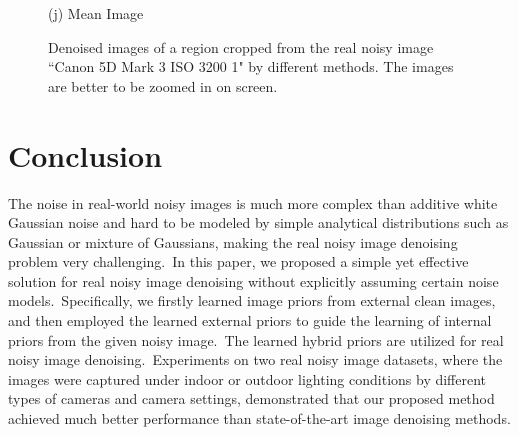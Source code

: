 \documentclass[10pt,twocolumn,letterpaper]{article}
\begin{document}
\begin{figure}
{\begin{minipage}[t]{0.195\textwidth}
{\footnotesize (j) Mean Image \cite{crosschannel2016}}
\end{minipage}
}\vspace{-1mm}
\caption{Denoised images of a region cropped from the real noisy image ``Canon 5D Mark 3 ISO 3200 1" by different methods. The images are better to be zoomed in on screen.}
\label{fig7}
\vspace{1mm}
\end{figure}


\section{Conclusion}

The noise in real-world noisy images is much more complex than additive white Gaussian noise and hard to be modeled by simple analytical distributions such as Gaussian or mixture of Gaussians, making the real noisy image denoising problem very challenging.\ In this paper, we proposed a simple yet effective solution for real noisy image denoising without explicitly assuming certain noise models.\ Specifically, we firstly learned image priors from external clean images, and then employed the learned external priors to guide the learning of internal priors from the given noisy image.\ The learned hybrid priors are utilized for real noisy image denoising.\ Experiments on two real noisy image datasets, where the images were captured under indoor or outdoor lighting conditions by different types of cameras and camera settings, demonstrated that our proposed method achieved much better performance than state-of-the-art image denoising methods.



{
\small


}
\end{document}
